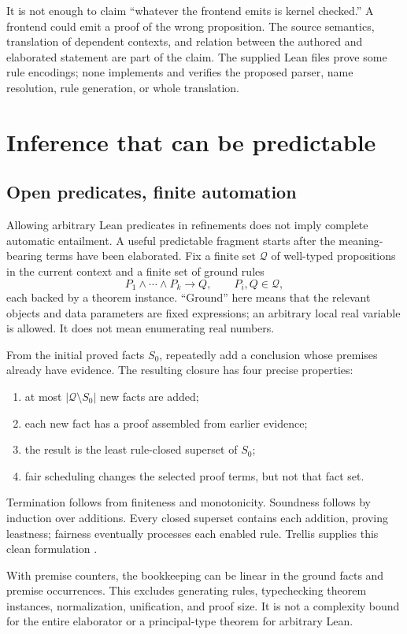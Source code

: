 \documentclass[11pt,letterpaper]{article}
\theoremstyle{definition}\newtheorem{definition}[proposition]{Definition}
\theoremstyle{remark}\newtheorem{remark}[proposition]{Remark}
\begin{document}
It is not enough to claim ``whatever the frontend emits is kernel checked.''
A frontend could emit a proof of the wrong proposition. The source semantics,
translation of dependent contexts, and relation between the authored and
elaborated statement are part of the claim. The supplied Lean files prove some
rule encodings; none implements and verifies the proposed parser, name
resolution, rule generation, or whole translation.

\section{Inference that can be predictable}\label{sec:inference}

\subsection{Open predicates, finite automation}
Allowing arbitrary Lean predicates in refinements does not imply complete
automatic entailment. A useful predictable fragment starts after the
meaning-bearing terms have been elaborated. Fix a finite set $\mathcal Q$ of
well-typed propositions in the current context and a finite set of ground rules
\[
 P_1\wedge\cdots\wedge P_k\longrightarrow Q,
 \qquad P_i,Q\in\mathcal Q,
\]
each backed by a theorem instance. ``Ground'' here means that the relevant
objects and data parameters are fixed expressions; an arbitrary local real
variable is allowed. It does not mean enumerating real numbers.

From the initial proved facts $S_0$, repeatedly add a conclusion whose premises
already have evidence. The resulting closure has four precise properties:
\begin{enumerate}
\item at most $|\mathcal Q\setminus S_0|$ new facts are added;
\item each new fact has a proof assembled from earlier evidence;
\item the result is the least rule-closed superset of $S_0$;
\item fair scheduling changes the selected proof terms, but not that fact set.
\end{enumerate}
Termination follows from finiteness and monotonicity. Soundness follows by
induction over additions. Every closed superset contains each addition, proving
leastness; fairness eventually processes each enabled rule. Trellis supplies
this clean formulation \cite[Section 7]{trellis}.

With premise counters, the bookkeeping can be linear in the ground facts and
premise occurrences. This excludes generating rules, typechecking theorem
instances, normalization, unification, and proof size. It is not a complexity
bound for the entire elaborator or a principal-type theorem for arbitrary Lean.
\end{document}
